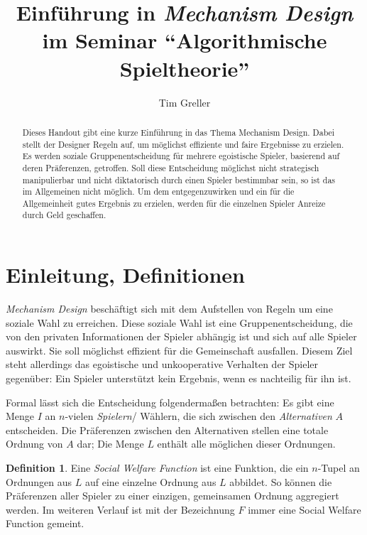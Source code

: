 \documentclass[a4paper,11pt]{article}
\title{Einführung in \textit{Mechanism Design} \\ \Large im Seminar ``Algorithmische Spieltheorie''}
\author{Tim Greller}
\theoremstyle{definition}
\newtheorem{definition}{Definition}
\theoremstyle{plain}
\theoremstyle{definition}
\begin{document}
\maketitle

\begin{abstract}
	Dieses Handout gibt eine kurze Einführung in das Thema Mechanism Design. Dabei stellt der Designer Regeln auf, um möglichst effiziente und faire Ergebnisse zu erzielen. Es werden soziale Gruppenentscheidung für mehrere egoistische Spieler, basierend auf deren Präferenzen, getroffen. Soll diese Entscheidung möglichst nicht strategisch manipulierbar und nicht diktatorisch durch einen Spieler bestimmbar sein, so ist das im Allgemeinen nicht möglich. Um dem entgegenzuwirken und ein für die Allgemeinheit gutes Ergebnis zu erzielen, werden für die einzelnen Spieler Anreize durch Geld geschaffen.
\end{abstract}

\setcounter{page}{0}
\fancyhead{}
\fancyhead[ER]{\leftmark}
\fancyhead[OL]{\rightmark}
\fancyhead[EL,OR]{\thepage}
\pagestyle{fancy}


\section{Einleitung, Definitionen}
\emph{Mechanism Design} beschäftigt sich mit dem Aufstellen von Regeln um eine soziale Wahl zu erreichen. Diese soziale Wahl ist eine Gruppenentscheidung, die von den privaten Informationen der Spieler abhängig ist und sich auf alle Spieler auswirkt. Sie soll möglichst effizient für die Gemeinschaft ausfallen. Diesem Ziel steht allerdings das egoistische und unkooperative Verhalten der Spieler gegenüber: Ein Spieler unterstützt kein Ergebnis, wenn es nachteilig für ihn ist.~\cite{ste08}

Formal lässt sich die Entscheidung folgendermaßen betrachten:
Es gibt eine Menge $I$ an $n$-vielen \emph{Spielern}/ Wählern, die sich zwischen den \emph{Alternativen} $A$ entscheiden. Die Präferenzen zwischen den Alternativen stellen eine totale Ordnung von $A$ dar; Die Menge $L$ enthält alle möglichen dieser Ordnungen.~\cite{nis07}

\begin{definition}
	\label{def:socialwelfarefunc}
	Eine \emph{Social Welfare Function} ist eine Funktion, die ein $n$-Tupel an Ordnungen aus $L$ auf eine einzelne Ordnung aus $L$ abbildet. So können die Präferenzen aller Spieler zu einer einzigen, gemeinsamen Ordnung aggregiert werden. Im weiteren Verlauf ist mit der Bezeichnung $F$ immer eine Social Welfare Function gemeint.
\end{definition}
\end{document}
